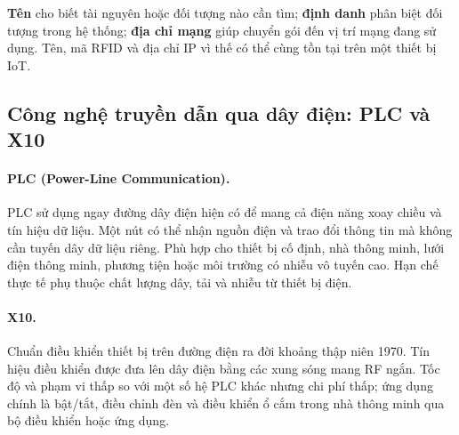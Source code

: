 \begin{ghinho}[title={Phân biệt ba khái niệm}]
\textbf{Tên} cho biết tài nguyên hoặc đối tượng nào cần tìm; \textbf{định danh} phân biệt đối tượng trong hệ thống; \textbf{địa chỉ mạng} giúp chuyển gói đến vị trí mạng đang sử dụng. Tên, mã RFID và địa chỉ IP vì thế có thể cùng tồn tại trên một thiết bị IoT.
\end{ghinho}

\subsection{Công nghệ truyền dẫn qua dây điện: PLC và X10}
\paragraph{PLC (Power-Line Communication).} PLC sử dụng ngay đường dây điện hiện có để mang cả điện năng xoay chiều và tín hiệu dữ liệu. Một nút có thể nhận nguồn điện và trao đổi thông tin mà không cần tuyến dây dữ liệu riêng. Phù hợp cho thiết bị cố định, nhà thông minh, lưới điện thông minh, phương tiện hoặc môi trường có nhiễu vô tuyến cao. Hạn chế thực tế phụ thuộc chất lượng dây, tải và nhiễu từ thiết bị điện. 

\paragraph{X10.} Chuẩn điều khiển thiết bị trên đường điện ra đời khoảng thập niên 1970. Tín hiệu điều khiển được đưa lên dây điện bằng các xung sóng mang RF ngắn. Tốc độ và phạm vi thấp so với một số hệ PLC khác nhưng chi phí thấp; ứng dụng chính là bật/tắt, điều chỉnh đèn và điều khiển ổ cắm trong nhà thông minh qua bộ điều khiển hoặc ứng dụng. 

